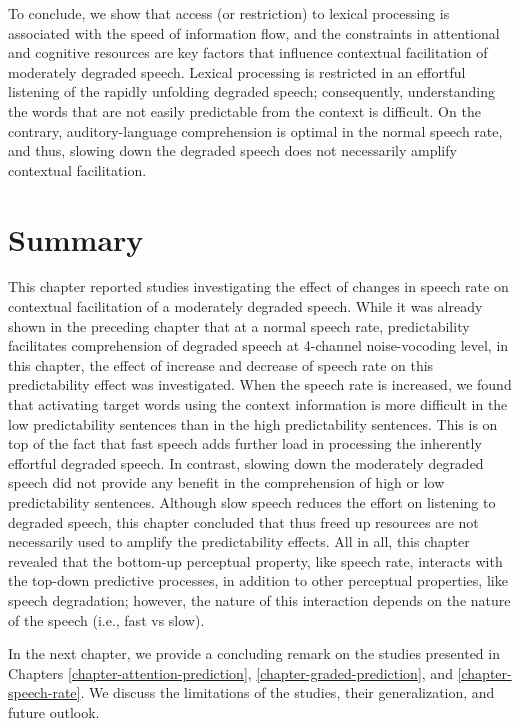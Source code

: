 \documentclass[a4paper, nobind]{templates/ociamthesis}
\begin{document}
To conclude, we show that access (or restriction) to lexical processing is associated with the speed of information flow, and the constraints in attentional and cognitive resources are key factors that influence contextual facilitation of moderately degraded speech.
Lexical processing is restricted in an effortful listening of the rapidly unfolding degraded speech;
consequently, understanding the words that are not easily predictable from the context is difficult.
On the contrary, auditory-language comprehension is optimal in the normal speech rate, and thus, slowing down the degraded speech does not necessarily amplify contextual facilitation.

\hypertarget{summary-4}{%
\section{Summary}\label{summary-4}}

This chapter reported studies investigating the effect of changes in speech rate on contextual facilitation of a moderately degraded speech.
While it was already shown in the preceding chapter that at a normal speech rate, predictability facilitates comprehension of degraded speech at 4-channel noise-vocoding level,
in this chapter, the effect of increase and decrease of speech rate on this predictability effect was investigated.
When the speech rate is increased, we found that activating target words using the context information is more difficult in the low predictability sentences than in the high predictability sentences.
This is on top of the fact that fast speech adds further load in processing the inherently effortful degraded speech.
In contrast, slowing down the moderately degraded speech did not provide any benefit in the comprehension of high or low predictability sentences.
Although slow speech reduces the effort on listening to degraded speech,
this chapter concluded that thus freed up resources are not necessarily used to amplify the predictability effects.
All in all, this chapter revealed that the bottom-up perceptual property, like speech rate, interacts with the top-down predictive processes, in addition to other perceptual properties, like speech degradation;
however, the nature of this interaction depends on the nature of the speech (i.e., fast vs slow).

In the next chapter, we provide a concluding remark on the studies presented in Chapters \ref{chapter-attention-prediction}, \ref{chapter-graded-prediction}, and \ref{chapter-speech-rate}.
We discuss the limitations of the studies, their generalization, and future outlook.
\end{document}
